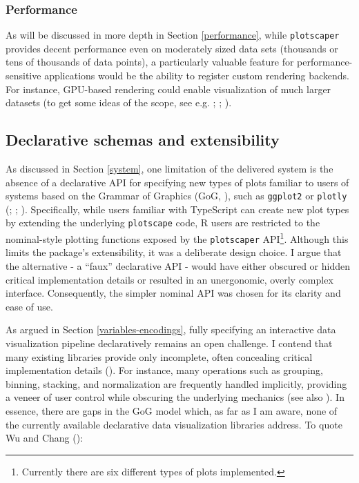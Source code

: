 \documentclass[
  openany]{book}
\theoremstyle{definition}
\theoremstyle{definition}
\theoremstyle{definition}
\theoremstyle{definition}
\theoremstyle{remark}
\begin{document}
\subsubsection{Performance}\label{perf}

As will be discussed in more depth in Section \ref{performance}, while \texttt{plotscaper} provides decent performance even on moderately sized data sets (thousands or tens of thousands of data points), a particularly valuable feature for performance-sensitive applications would be the ability to register custom rendering backends. For instance, GPU-based rendering could enable visualization of much larger datasets (to get some ideas of the scope, see e.g. ; ; ).

\subsection{Declarative schemas and extensibility}\label{declarative-schemas}

As discussed in Section \ref{system}, one limitation of the delivered system is the absence of a declarative API for specifying new types of plots familiar to users of systems based on the Grammar of Graphics (GoG, ), such as \texttt{ggplot2} or \texttt{plotly} (; ; ). Specifically, while users familiar with TypeScript can create new plot types by extending the underlying \texttt{plotscape} code, R users are restricted to the nominal-style plotting functions exposed by the \texttt{plotscaper} API\footnote{Currently there are six different types of plots implemented.}. Although this limits the package's extensibility, it was a deliberate design choice. I argue that the alternative - a ``faux'' declarative API - would have either obscured or hidden critical implementation details or resulted in an unergonomic, overly complex interface. Consequently, the simpler nominal API was chosen for its clarity and ease of use.

As argued in Section \ref{variables-encodings}, fully specifying an interactive data visualization pipeline declaratively remains an open challenge. I contend that many existing libraries provide only incomplete, often concealing critical implementation details (). For instance, many operations such as grouping, binning, stacking, and normalization are frequently handled implicitly, providing a veneer of user control while obscuring the underlying mechanics (see also ). In essence, there are gaps in the GoG model which, as far as I am aware, none of the currently available declarative data visualization libraries address. To quote Wu and Chang ():
\end{document}
